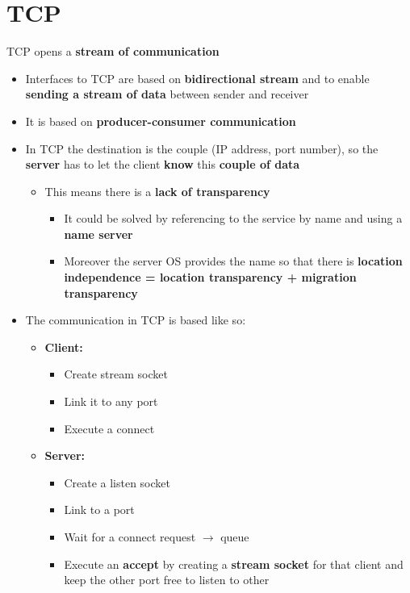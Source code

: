 \section{TCP}
TCP opens a \textbf{stream of communication}
\begin{itemize}
    \item Interfaces to TCP are based on \textbf{bidirectional stream} and to enable \textbf{sending a stream of data} between sender and receiver
    \item It is based on \textbf{producer-consumer communication}
    \item In TCP the destination is the couple (IP address, port number), so the \textbf{server} has to let the client \textbf{know} this \textbf{couple of data}
        \begin{itemize}
            \item This means there is a \textbf{lack of transparency}
                \begin{itemize}
                    \item It could be solved by referencing to the service by name and using a \textbf{name server}
                    \item Moreover the server OS provides the name so that there is \textbf{location independence = location transparency + migration transparency}
                \end{itemize}
        \end{itemize}
    \item The communication in TCP is based like so:
        \begin{itemize}
            \item \textbf{Client:}
                \begin{itemize}
                    \item Create stream socket
                    \item Link it to any port
                    \item Execute a connect
                \end{itemize}
            \item \textbf{Server:}
                \begin{itemize}
                    \item Create a listen socket
                    \item Link to a port
                    \item Wait for a connect request \(\rightarrow\) queue
                    \item Execute an \textbf{accept} by creating a \textbf{stream socket} for that client and keep the other port free to listen to other

\end{itemize}
\end{itemize}
\end{itemize}
